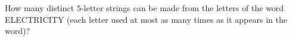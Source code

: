 How many distinct $5$-letter strings can be made from the letters of the word ELECTRICITY (each letter used at most as many times as it appears in the word)?
